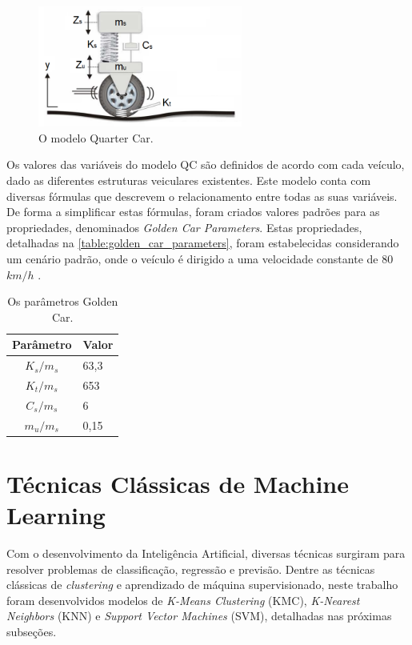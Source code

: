 \begin{figure}[h]
  \centering
  \caption{O modelo Quarter Car.}
   \label{fig:quarter_car}
   \includegraphics[width=0.6\textwidth]{figuras/fig_4.png}
\end{figure}

Os valores das variáveis do modelo QC são definidos de acordo com cada veículo, dado as diferentes estruturas veiculares existentes. Este modelo conta com diversas fórmulas que descrevem o relacionamento entre todas as suas variáveis. De forma a simplificar estas fórmulas, foram criados valores padrões para as propriedades, denominados \textit{Golden Car Parameters}. Estas propriedades, detalhadas na \autoref{table:golden_car_parameters}, foram estabelecidas considerando um cenário padrão, onde o veículo é dirigido a uma velocidade constante de 80 $km/h$ \cite{Loizos2008}.

\begin{table}[h]
    \caption{Os parâmetros Golden Car.}
    \label{table:golden_car_parameters}
    \centering
    \small
    \begin{tabular}{cl}
        \toprule
        \textbf{Parâmetro} & \textbf{Valor} \\
        \toprule
        $K_s/m_s$ & 63,3 \\
        \midrule
        $K_t/m_s$ & 653 \\
        \midrule
        $C_s/m_s$ & 6 \\
        \midrule
        $m_u/m_s$ & 0,15 \\
        \bottomrule
    \end{tabular}
\end{table}

\section{Técnicas Clássicas de Machine Learning}

Com o desenvolvimento da Inteligência Artificial, diversas técnicas surgiram para resolver problemas de classificação, regressão e previsão. Dentre as técnicas clássicas de \textit{clustering} e aprendizado de máquina supervisionado, neste trabalho foram desenvolvidos modelos de \textit{K-Means Clustering} (KMC), \textit{K-Nearest Neighbors} (KNN) e \textit{Support Vector Machines} (SVM), detalhadas nas próximas subseções.

